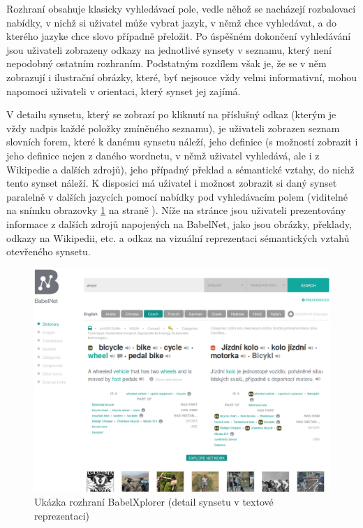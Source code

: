 \documentclass[a4paper, 11pt, oneside]{book}
\begin{document}
					Rozhraní obsahuje klasicky vyhledávací pole, vedle něhož se nacházejí rozbalovací nabídky, v nichž si uživatel může vybrat jazyk, v němž chce vyhledávat, a do kterého jazyke chce slovo případně přeložit. Po úspěšném dokončení vyhledávání jsou uživateli zobrazeny odkazy na jednotlivé synsety v seznamu, který není nepodobný ostatním rozhraním. Podstatným rozdílem však je, že se v něm zobrazují i ilustrační obrázky, které, byť nejsouce vždy velmi informativní, mohou napomoci uživateli v orientaci, který synset jej zajímá. 

					V detailu synsetu, který se zobrazí po kliknutí na příslušný odkaz (kterým je vždy nadpis každé položky zmíněného seznamu), je uživateli zobrazen seznam slovních forem, které k danému synsetu náleží, jeho definice (s možností zobrazit i jeho definice nejen z daného wordnetu, v němž uživatel vyhledává, ale i z Wikipedie a dalších zdrojů), jeho případný překlad a sémantické vztahy, do nichž tento synset náleží. K disposici má uživatel i možnost zobrazit si daný synset paralelně v dalších jazycích pomocí nabídky pod vyhledávacím polem (viditelné na snímku obrazovky \ref{fig:babelxplorer} na straně \pageref{fig:babelxplorer}). Níže na stránce jsou uživateli prezentovány informace z dalších zdrojů napojených na BabelNet, jako jsou obrázky, překlady, odkazy na Wikipedii, etc. a odkaz na vizuální reprezentaci sémantických vztahů otevřeného synsetu. 

					\begin{figure}[h]
						\centering
						\includegraphics[width=1.0\textwidth]{babelxplorer.png}
						\caption{Ukázka rozhraní BabelXplorer (detail synsetu v textové reprezentaci)}
						\label{fig:babelxplorer}
					\end{figure}
\end{document}
